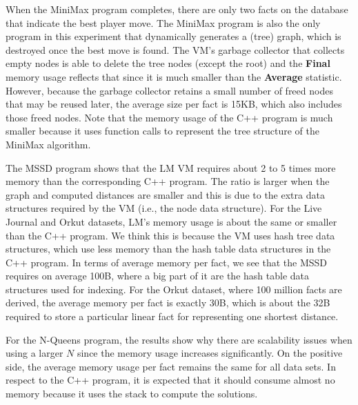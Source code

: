 \begin{table}[ht]
   \begin{center}
      
   \end{center}


   \label{table:implementation:cmem}
\end{table}

When the MiniMax program completes, there are only two facts on the database
that indicate the best player move. The MiniMax program is also the only program
in this experiment that dynamically generates a (tree) graph, which is destroyed
once the best move is found. The VM's garbage collector that collects empty
nodes is able to delete the tree nodes (except the root) and the \textbf{Final}
memory usage reflects that since it is much smaller than the \textbf{Average}
statistic. However, because the garbage collector retains a small number of
freed nodes that may be reused later, the average size per fact is 15KB, which
also includes those freed nodes. Note that the memory usage of the C++ program
is much smaller because it uses function calls to represent the tree structure
of the MiniMax algorithm.

The MSSD program shows that the LM VM requires about 2 to 5 times more memory
than the corresponding C++ program. The ratio is larger when the graph and
computed distances are smaller and this is due to the extra data structures
required by the VM (i.e., the node data structure). For the Live Journal and
Orkut datasets, LM's memory usage is about the same or smaller than the C++
program. We think this is because the VM uses hash tree data structures, which
use less memory than the hash table data structures in the C++ program. In terms
of average memory per fact, we see that the MSSD requires on average 100B, where
a big part of it are the hash table data structures used for indexing. For the
Orkut dataset, where 100 million facts are derived, the average memory per fact
is exactly 30B, which is about the 32B required to store a particular linear
fact for representing one shortest distance.

For the N-Queens program, the results show why there are scalability
issues when using a larger $N$ since the memory usage increases significantly.
On the positive side, the average memory usage per fact remains the same for all
data sets. In respect to the C++ program, it is expected that it should consume
almost no memory because it uses the stack to compute the solutions.

